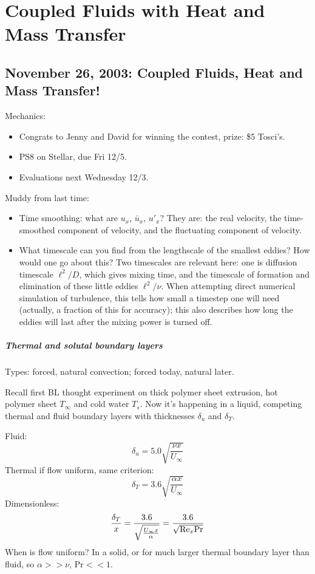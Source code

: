\documentclass{report}
\begin{document}
\chapter{Coupled Fluids with Heat and Mass Transfer}

\section{November 26, 2003: Coupled Fluids, Heat and Mass Transfer!}

Mechanics:
\begin{itemize}
\item Congrats to Jenny and David for winning the contest, prize: \$5 Tosci's.
\item PS8 on Stellar, due Fri 12/5.
\item Evaluations next Wednesday 12/3.
\end{itemize}
Muddy from last time:
\begin{itemize}
\item Time smoothing: what are $u_x$, $\bar{u}_x$, $u'_x$?  They are: the real
  velocity, the time-smoothed component of velocity, and the fluctuating
  component of velocity.
\item What timescale can you find from the lengthscale of the smallest eddies?
  How would one go about this?  Two timescales are relevant here: one is
  diffusion timescale $\ell^2/D$, which gives mixing time, and the timescale of
  formation and elimination of these little eddies $\ell^2/\nu$.  When
  attempting direct numerical simulation of turbulence, this tells how small a
  timestep one will need (actually, a fraction of this for accuracy); this also
  describes how long the eddies will last after the mixing power is turned off.
\end{itemize}

\paragraph{Thermal and solutal boundary layers}

Types: forced, natural convection; forced today, natural later.

Recall first BL thought experiment on thick polymer sheet extrusion, hot
polymer sheet $T_\infty$ and cold water $T_s$.  Now it's happening in a liquid,
competing thermal and fluid boundary layers with thicknesses $\delta_u$ and
$\delta_T$.

Fluid:
$$\delta_u = 5.0\sqrt{\frac{\nu x}{U_\infty}}$$
Thermal if flow uniform, same criterion:
$$\delta_T = 3.6\sqrt{\frac{\alpha x}{U_\infty}}$$
Dimensionless:
$$\frac{\delta_T}{x} = \frac{3.6}{\sqrt{\frac{U_\infty x}{\alpha}}} =
\frac{3.6}{\sqrt{{\rm Re}_x{\rm Pr}}}$$
When is flow uniform?  In a solid, or for much larger thermal boundary layer
than fluid, so $\alpha>>\nu$, Pr$<<1$.
\end{document}
